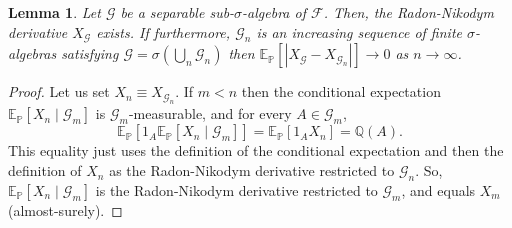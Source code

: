 \documentclass[12pt]{article}
\newtheorem{lemma}{Lemma}
\begin{document}
\begin{lemma}\label{lem:1}
Let $\mathcal{G}$ be a separable sub-$\sigma$-algebra of $\mathcal{F}$. Then, the Radon-Nikodym derivative $X_\mathcal{G}$ exists.
If furthermore, $\mathcal{G}_n$ is an increasing sequence of finite $\sigma$-algebras satisfying $\mathcal{G}=\sigma(\bigcup_n\mathcal{G}_n)$ then $\mathbb{E}_\mathbb{P}[|X_{\mathcal{G}}-X_{\mathcal{G}_n}|]\rightarrow 0$ as $n\rightarrow\infty$.
\end{lemma}
\begin{proof}
Let us set $X_n\equiv X_{\mathcal{G}_n}$.
If $m<n$ then the conditional expectation $\mathbb{E}_{\mathbb{P}}[X_n\mid\mathcal{G}_m]$ is $\mathcal{G}_m$-measurable, and for every $A\in\mathcal{G}_m$,
\begin{equation*}
\mathbb{E}_\mathbb{P}\left[1_A\mathbb{E}_{\mathbb{P}}[X_n\mid\mathcal{G}_m]\right]
=\mathbb{E}_{\mathbb{P}}\left[1_AX_n\right]=\mathbb{Q}(A).
\end{equation*}
This equality just uses the definition of the conditional expectation and then the definition of $X_n$ as the Radon-Nikodym derivative restricted to $\mathcal{G}_n$. So, $\mathbb{E}_{\mathbb{P}}[X_n\mid\mathcal{G}_m]$ is the Radon-Nikodym derivative restricted to $\mathcal{G}_m$, and equals $X_m$ (almost-surely).


\end{proof}
\end{document}
